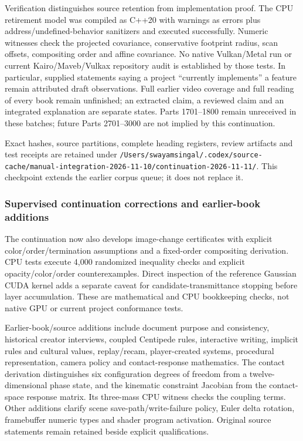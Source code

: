 Verification distinguishes source retention from implementation proof. The CPU retirement model was compiled as C++20 with warnings as errors plus address/undefined-behavior sanitizers and executed successfully. Numeric witnesses check the projected covariance, conservative footprint radius, scan offsets, compositing order and affine covariance. No native Vulkan/Metal run or current Kairo/Maveb/Vulkax repository audit is established by those tests. In particular, supplied statements saying a project ``currently implements'' a feature remain attributed draft observations. Full earlier video coverage and full reading of every book remain unfinished; an extracted claim, a reviewed claim and an integrated explanation are separate states. Parts 1701--1800 remain unreceived in these batches; future Parts 2701--3000 are not implied by this continuation.

Exact hashes, source partitions, complete heading registers, review artifacts and test receipts are retained under \texttt{/Users/swayamsingal/.codex/source-cache/manual-integration-2026-11-10/continuation-2026-11-11/}. This checkpoint extends the earlier corpus queue; it does not replace it.

\subsubsection{Supervised continuation corrections and earlier-book additions}\label{appendix-3b67654799a2-supervised-continuation-corrections-and-earlier-book-additions}

The continuation now also develops image-change certificates with explicit color/order/termination assumptions and a fixed-order compositing derivation. CPU tests execute 4,000 randomized inequality checks and explicit opacity/color/order counterexamples. Direct inspection of the reference Gaussian CUDA kernel adds a separate caveat for candidate-transmittance stopping before layer accumulation. These are mathematical and CPU bookkeeping checks, not native GPU or current project conformance tests.

Earlier-book/source additions include document purpose and consistency, historical creator interviews, coupled Centipede rules, interactive writing, implicit rules and cultural values, replay/recam, player-created systems, procedural representation, camera policy and contact-response mathematics. The contact derivation distinguishes six configuration degrees of freedom from a twelve-dimensional phase state, and the kinematic constraint Jacobian from the contact-space response matrix. Its three-mass CPU witness checks the coupling terms. Other additions clarify scene save-path/write-failure policy, Euler delta rotation, framebuffer numeric types and shader program activation. Original source statements remain retained beside explicit qualifications.

